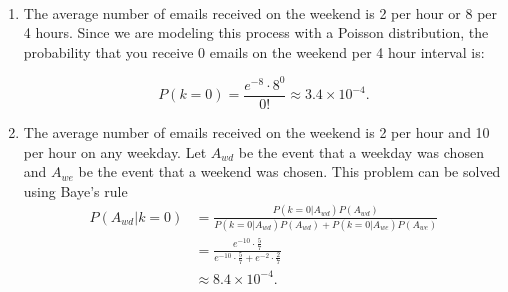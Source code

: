 \begin{problem}{11} $ $

\begin{enumerate}

\item The average number of emails received on the weekend is 2 per hour or 8 per 4 hours.  Since we are modeling this process with a Poisson distribution, the probability that you receive 0 emails on the weekend per 4 hour interval is:

\begin{equation}
P(k=0) = \frac{e^{-8}\cdot 8^0}{0!} \approx 3.4 \times 10^{-4}.
\end{equation}

\item The average number of emails received on the weekend is 2 per hour and 10 per hour on any weekday.  Let $A_{wd}$
 be the event that a weekday was chosen and $A_{we}$ be the event that a weekend was chosen.  This problem can be solved using Baye's rule
 \begin{align*}
 P(A_{wd}|k=0) & = \frac{P(k=0|A_{wd})P(A_{wd})}{P(k=0|A_{wd})P(A_{wd})+P(k=0|A_{we})P(A_{we})} \\
 &=\frac{e^{-10}\cdot \frac{5}{7}}{e^{-10}\cdot \frac{5}{7}+e^{-2} \cdot \frac{2}{7}} \\
 & \approx 8.4 \times 10^{-4}.
 \end{align*}
 
\end{enumerate}

\end{problem}


